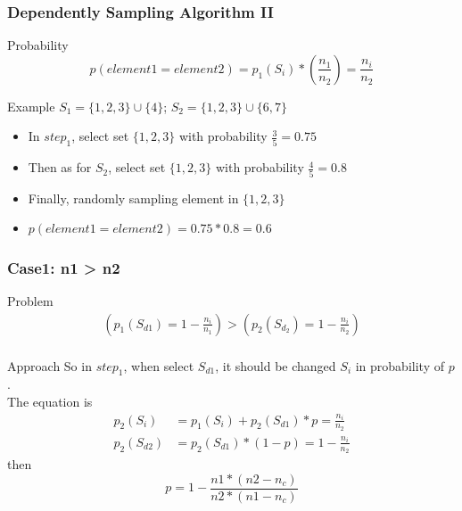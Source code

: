 \documentclass[notheorems, aspectratio=54]{beamer}
\begin{document}
\begin{frame}
    \frametitle{Dependently Sampling Algorithm II}
    \begin{block}{Probability}
        $$
            p(element1 = element2) = p_1(S_i)*(\frac{n_1}{n_2}) = \frac{n_i}{n_2}
        $$
    \end{block}
    \begin{block}{Example}
        $S_1 =  \{1,2,3\} \cup \{4\}$; $S_2 = \{1,2,3\} \cup \{6,7\}$
        \begin{itemize}
            \item In $step_1$, select set $\{1,2,3\}$ with probability $\frac{3}{5} = 0.75$
            \item Then as for $S_2$, select set $\{1,2,3\}$ with probability $\frac{4}{5}=0.8$
            \item Finally, randomly sampling element in $\{1,2,3\}$
            \item $p(element1 = element2) = 0.75*0.8=0.6$
        \end{itemize}
    \end{block}
\end{frame}

\begin{frame}
    \frametitle{Case1: n1 > n2}
    \begin{block}{Problem}
        \begin{equation}
            \begin{aligned}
                (p_1(S_{d1}) = 1-\frac{n_i}{n_1}) > (p_2(S_{d_2}) = 1-\frac{n_i}{n_2}) \\
            \end{aligned}
        \end{equation}
    \end{block}
    \begin{block}{Approach}
        So in $step_1$, when select $S_{d1}$, it should be changed $S_{i}$ in probability of $p$. \\
        The equation is 
        \begin{equation}
            \begin{aligned}
                p_2(S_i) &= p_1(S_i)+p_2(S_{d1})*p = \frac{n_i}{n_2} \\
                p_2(S_{d2}) &= p_2(S_{d1})*(1-p) = 1-\frac{n_i}{n_2}
            \end{aligned}
        \end{equation}
        then
        $$p = 1-\frac{n1*(n2-n_c)}{n2*(n1-n_c)}$$
    \end{block}
\end{frame}
\end{document}
